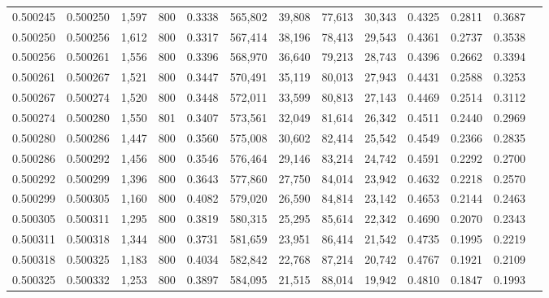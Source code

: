 \begin{tabular}{rrrrrrrrrrrrr}
0.500245 & 0.500250 &  1,597 &   800 &                                     0.3338 & 565,802 &  39,808 &  77,613 &  30,343 & 0.4325 & 0.2811 & 0.3687 \\
0.500250 & 0.500256 &  1,612 &   800 &                                     0.3317 & 567,414 &  38,196 &  78,413 &  29,543 & 0.4361 & 0.2737 & 0.3538 \\
0.500256 & 0.500261 &  1,556 &   800 &                                     0.3396 & 568,970 &  36,640 &  79,213 &  28,743 & 0.4396 & 0.2662 & 0.3394 \\
0.500261 & 0.500267 &  1,521 &   800 &                                     0.3447 & 570,491 &  35,119 &  80,013 &  27,943 & 0.4431 & 0.2588 & 0.3253 \\
0.500267 & 0.500274 &  1,520 &   800 &                                     0.3448 & 572,011 &  33,599 &  80,813 &  27,143 & 0.4469 & 0.2514 & 0.3112 \\
0.500274 & 0.500280 &  1,550 &   801 &                                     0.3407 & 573,561 &  32,049 &  81,614 &  26,342 & 0.4511 & 0.2440 & 0.2969 \\
0.500280 & 0.500286 &  1,447 &   800 &                                     0.3560 & 575,008 &  30,602 &  82,414 &  25,542 & 0.4549 & 0.2366 & 0.2835 \\
0.500286 & 0.500292 &  1,456 &   800 &                                     0.3546 & 576,464 &  29,146 &  83,214 &  24,742 & 0.4591 & 0.2292 & 0.2700 \\
0.500292 & 0.500299 &  1,396 &   800 &                                     0.3643 & 577,860 &  27,750 &  84,014 &  23,942 & 0.4632 & 0.2218 & 0.2570 \\
0.500299 & 0.500305 &  1,160 &   800 &                                     0.4082 & 579,020 &  26,590 &  84,814 &  23,142 & 0.4653 & 0.2144 & 0.2463 \\
0.500305 & 0.500311 &  1,295 &   800 &                                     0.3819 & 580,315 &  25,295 &  85,614 &  22,342 & 0.4690 & 0.2070 & 0.2343 \\
0.500311 & 0.500318 &  1,344 &   800 &                                     0.3731 & 581,659 &  23,951 &  86,414 &  21,542 & 0.4735 & 0.1995 & 0.2219 \\
0.500318 & 0.500325 &  1,183 &   800 &                                     0.4034 & 582,842 &  22,768 &  87,214 &  20,742 & 0.4767 & 0.1921 & 0.2109 \\
0.500325 & 0.500332 &  1,253 &   800 &                                     0.3897 & 584,095 &  21,515 &  88,014 &  19,942 & 0.4810 & 0.1847 & 0.1993 \\

\end{tabular}

